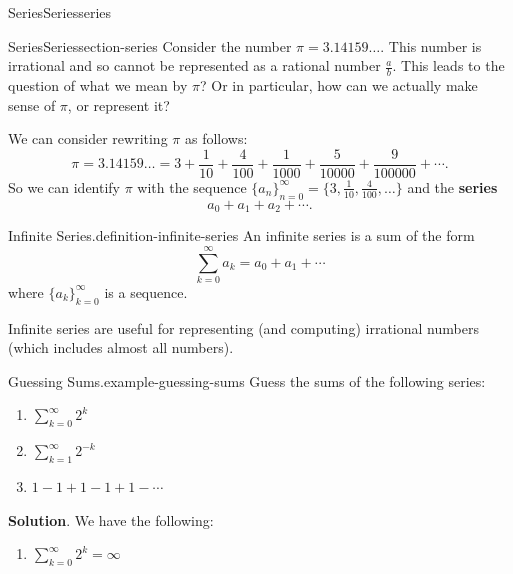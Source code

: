 \documentclass[oneside,10pt,]{book}
\newcommand{\terminology}[1]{\textbf{#1}}
\numberwithin{equation}{section}
\begin{document}
\begin{chapterptx}{Series}{}{Series}{}{}{series}
\typeout{************************************************}
%
\begin{sectionptx}{Series}{}{Series}{}{}{section-series}
\hypertarget{p-826}{}%
Consider the number \(\pi = 3.14159\ldots\). This number is irrational and so cannot be represented as a rational number \(\frac{a}{b}\). This leads to the question of what we mean by \(\pi\)? Or in particular, how can we actually make sense of \(\pi\), or represent it?%
\par
\hypertarget{p-827}{}%
We can consider rewriting \(\pi\) as follows:%
\begin{equation*}
\pi = 3.14159\ldots = 3 + \frac{1}{10} + \frac{4}{100} + \frac{1}{1000} + \frac{5}{10000} + \frac{9}{100000} + \cdots\text{.}
\end{equation*}
So we can identify \(\pi\) with the sequence \(\{a_{n}\}_{n=0}^{\infty} = \{3, \frac{1}{10}, \frac{4}{100}, \ldots\}\) and the \terminology{series}%
\begin{equation*}
a_{0} + a_{1} + a_{2} + \cdots\text{.}
\end{equation*}
%
\begin{definition}{Infinite Series.}{definition-infinite-series}%
\hypertarget{p-828}{}%
An infinite series is a sum of the form%
\begin{equation*}
\sum_{k=0}^{\infty}a_{k} = a_{0} + a_{1} + \cdots
\end{equation*}
where \(\{a_{k}\}_{k=0}^{\infty}\) is a sequence.%
\end{definition}
\hypertarget{p-829}{}%
Infinite series are useful for representing (and computing) irrational numbers (which includes almost all numbers).%
\begin{example}{Guessing Sums.}{example-guessing-sums}%
\hypertarget{p-830}{}%
Guess the sums of the following series:\leavevmode%
\begin{enumerate}
\item\hypertarget{li-88}{}\(\sum_{k=0}^{\infty}2^{k}\)%
\item\hypertarget{li-89}{}\(\sum_{k=1}^{\infty}2^{-k}\)%
\item\hypertarget{li-90}{}\(1 - 1 + 1 - 1 + 1 - \cdots\)%
\end{enumerate}
%
\par\smallskip%
\noindent\textbf{Solution}.\hypertarget{solution-171}{}\quad%
\hypertarget{p-831}{}%
We have the following:\leavevmode%
\begin{enumerate}
\item\hypertarget{li-91}{}\(\sum_{k=0}^{\infty}2^{k} = \infty\)%

\end{enumerate}
\end{example}
\end{sectionptx}
\end{chapterptx}
\end{document}
